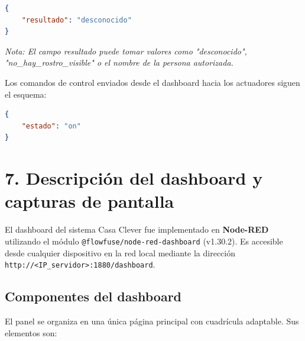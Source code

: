\documentclass[12pt, a4paper]{report}
\begin{document}
\begin{lstlisting}[language=json, caption={Mensaje JSON generado como salida de Python}]
{
    "resultado": "desconocido" 
}
\end{lstlisting}

\textit{Nota: El campo resultado puede tomar valores como "desconocido", "no\_hay\_rostro\_visible" o el nombre de la persona autorizada.}

Los comandos de control enviados desde el dashboard hacia los actuadores siguen el esquema:

\begin{lstlisting}[language=json, caption={Mensaje JSON de comando a actuador}]
{
    "estado": "on"
}
\end{lstlisting}


\chapter*{7. Descripción del dashboard y capturas de pantalla}

El dashboard del sistema Casa Clever fue implementado en \textbf{Node-RED} utilizando el módulo \texttt{@flowfuse/node-red-dashboard} (v1.30.2). Es accesible desde cualquier dispositivo en la red local mediante la dirección \texttt{http://\textless{}IP\_servidor\textgreater{}:1880/dashboard}.

\section*{Componentes del dashboard}

El panel se organiza en una única página principal con cuadrícula adaptable. Sus elementos son:
\end{document}
